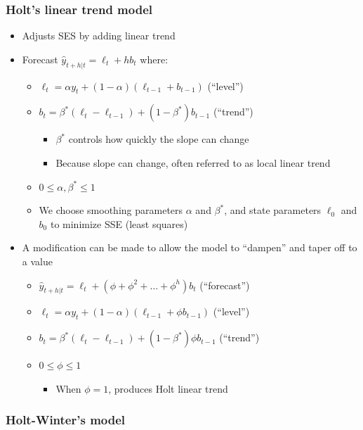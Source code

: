 \documentclass{article}\usepackage[]{graphicx}\usepackage[]{color}
\begin{document}
\subsubsection{Holt's linear trend model}

\begin{itemize}
    \item Adjusts SES by adding linear trend
    \item Forecast $\hat{y}_{t+h|t} = \ell_t + hb_t$ where:
    \begin{itemize}
        \item $\ell_t = \alpha y_t + (1 - \alpha)(\ell_{t-1} + b_{t-1})$ (``level'')
        \item $b_t = \beta^*(\ell_t - \ell_{t-1}) + (1 - \beta^*)b_{t-1}$ (``trend'')
        \begin{itemize}
            \item $\beta^*$ controls how quickly the slope can change
            \item Because slope can change, often referred to as local linear trend
        \end{itemize}
        \item $0 \le \alpha, \beta^* \le 1$ 
        \item We choose smoothing parameters $\alpha$ and $\beta^*$, and state parameters $\ell_0$ and $b_0$ to minimize SSE (least squares)
    \end{itemize}
    \item A modification can be made to allow the model to ``dampen'' and taper off to a value
    \begin{itemize}
        \item $\hat{y}_{t+h|t} = \ell_t + (\phi + \phi^2 + \ldots + \phi^h)b_t$ (``forecast'')
        \item $\ell_t = \alpha y_t + (1 - \alpha)(\ell_{t-1} + \phi b_{t-1})$ (``level'')
        \item $b_t = \beta^*(\ell_t - \ell_{t-1}) + (1 - \beta^*)\phi b_{t-1}$ (``trend'')
        \item $0 \le \phi \le 1$
        \begin{itemize}
            \item When $\phi = 1$, produces Holt linear trend
        \end{itemize}
    \end{itemize}
\end{itemize}

\subsubsection{Holt-Winter's model}
\end{document}

